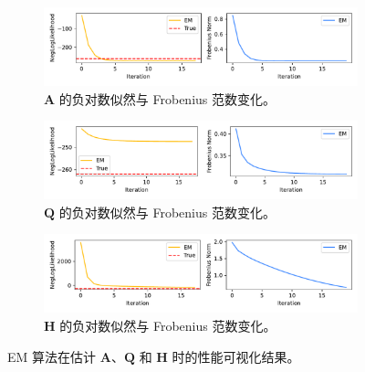 \begin{figure}[tb]
    \centering
    \begin{subfigure}[b]{0.95\textwidth}
        \includegraphics[width=\textwidth]{fig/A_neg_log_likelihood_fnorm.pdf}
        \caption{\(\mathbf{A}\) 的负对数似然与 Frobenius 范数变化。}
        \label{fig:subfig1}
    \end{subfigure}
    
    \begin{subfigure}[b]{0.95\textwidth}
        \includegraphics[width=\textwidth]{fig/Q_neg_log_likelihood_fnorm.pdf}
        \caption{\(\mathbf{Q}\) 的负对数似然与 Frobenius 范数变化。}
        \label{fig:subfig2}
    \end{subfigure}

    \begin{subfigure}[b]{0.95\textwidth}
    \includegraphics[width=\textwidth]{fig/H_neg_log_likelihood_fnorm.pdf}
    \caption{\(\mathbf{H}\) 的负对数似然与 Frobenius 范数变化。}
    \end{subfigure}
    \caption{EM 算法在估计 \(\mathbf{A}\)、\(\mathbf{Q}\) 和 \(\mathbf{H}\) 时的性能可视化结果。}
    \label{fig: exp car EM visualization}
\end{figure}

